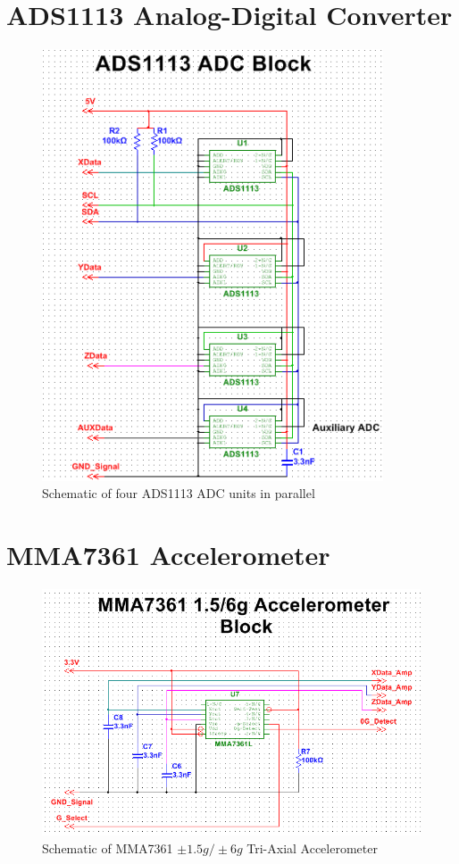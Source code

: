 \section{ADS1113 Analog-Digital Converter}
\begin{figure}[H]
\centering
\includegraphics[width=0.9\textwidth,height=0.9\textheight,keepaspectratio]{./KIRBY_Images/Multisim_4ADC}
\caption{Schematic of four ADS1113 ADC units in parallel}
\label{fig:Schematic_ADS1113}
\end{figure}


\section{MMA7361 Accelerometer}
\begin{figure}[H]
\centering
\includegraphics[width=\textwidth,height=\textheight,keepaspectratio]{./KIRBY_Images/Multisim_MMA7361}
\caption{Schematic of MMA7361 $\pm 1.5g/ \pm 6g$ Tri-Axial Accelerometer}
\label{fig:Schematic_MMA7361}
\end{figure}

